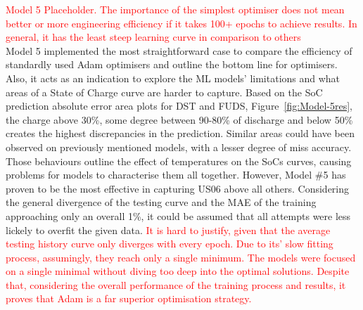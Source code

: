 %
%
\textcolor{red}{Model 5 Placeholder. The importance of the simplest optimiser does not mean better or more engineering efficiency if it takes 100+ epochs to achieve results. In general, it has the least steep learning curve in comparison to others} \\
Model 5 implemented the most straightforward case to compare the efficiency of standardly used Adam optimisers and outline the bottom line for optimisers.
Also, it acts as an indication to explore the ML models' limitations and what areas of a State of Charge curve are harder to capture.
Based on the SoC prediction absolute error area plots for DST and FUDS, Figure~\ref{fig:Model-5res}, the charge above 30\%, some degree between 90-80\% of discharge and below 50\% creates the highest discrepancies in the prediction.
Similar areas could have been observed on previously mentioned models, with a lesser degree of miss accuracy.
Those behaviours outline the effect of temperatures on the SoCs curves, causing problems for models to characterise them all together.
However, Model \#5 has proven to be the most effective in capturing US06 above all others.
Considering the general divergence of the testing curve and the MAE of the training approaching only an overall 1\%, it could be assumed that all attempts were less lickely to overfit the given data.
\textcolor{red}{
It is hard to justify, given that the average testing history curve only diverges with every epoch.
Due to its' slow fitting process, assumingly, they reach only a single minimum.
The models were focused on a single minimal without diving too deep into the optimal solutions.
Despite that, considering the overall performance of the training process and results, it proves that Adam is a far superior optimisation strategy.
}


